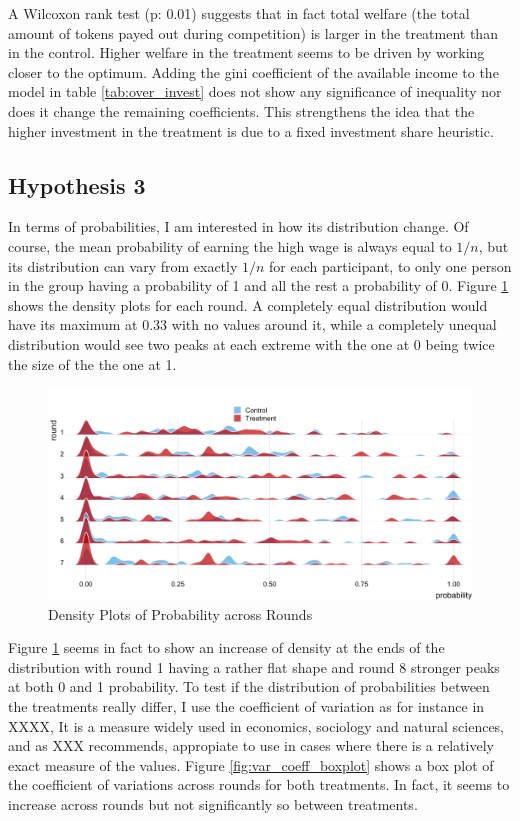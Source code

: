 A Wilcoxon rank test (p: 0.01) suggests that in fact total welfare (the total amount of tokens payed out during competition) is larger in the treatment than in the control. Higher welfare in the treatment seems to be driven by working closer to the optimum. Adding the gini coefficient of the available income to the model in table \ref{tab:over_invest} does not show any significance of inequality nor does it change the remaining coefficients. This strengthens the idea that the higher investment in the treatment is due to a fixed investment share heuristic.\\



\subsection{Hypothesis 3}

In terms of probabilities, I am interested in how its distribution change. Of course, the mean probability of earning the high wage is always equal to $1/n$, but its distribution can vary from exactly $1/n$ for each participant, to only one person in the group having a probability of 1 and all the rest a probability of 0. Figure \ref{fig:dens_prob} shows the density plots for each round. A completely equal distribution would have its maximum at 0.33 with no values around it, while a completely unequal distribution would see two peaks at each extreme with the one at 0 being twice the size of the the one at 1.\\

\begin{figure}[H]
    \centering
    \includegraphics[width = \textwidth]{graphs/density_ridge_prob.png}
    \caption{Density Plots of Probability across Rounds}
    \label{fig:dens_prob}
\end{figure}

Figure \ref{fig:dens_prob} seems in fact to show an increase of density at the ends of the distribution with round 1 having a rather flat shape and round 8 stronger peaks at both 0 and 1 probability. To test if the distribution of probabilities between the treatments really differ, I use the coefficient of variation as for instance in XXXX, It is a measure widely used in economics, sociology and natural sciences, and as XXX recommends, appropiate to use in cases where there is a relatively exact measure of the values. Figure \ref{fig:var_coeff_boxplot} shows a box plot of the coefficient of variations across rounds for both treatments. In fact, it seems to increase across rounds but not significantly so between treatments.\\


